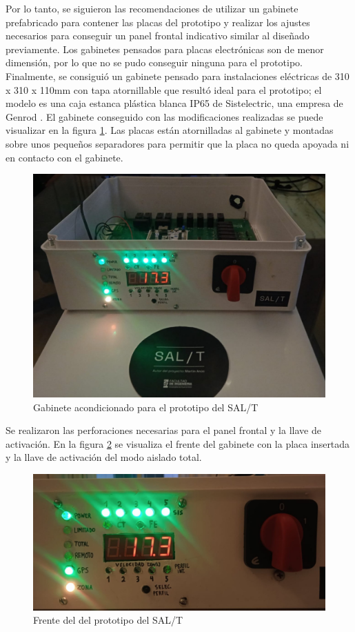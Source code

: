 Por lo tanto, se siguieron las recomendaciones de utilizar un gabinete prefabricado para contener las placas del prototipo y realizar los ajustes necesarios para conseguir un panel frontal indicativo similar al diseñado previamente. Los gabinetes pensados para placas electrónicas son de menor dimensión, por lo que no se pudo conseguir ninguna para el prototipo. Finalmente, se consiguió un gabinete pensado para instalaciones eléctricas de 310 x 310 x 110mm con tapa atornillable que resultó ideal para el prototipo; el modelo es una caja estanca plástica blanca IP65 de Sistelectric, una empresa de Genrod \cite{gabinete}. El gabinete conseguido con las modificaciones realizadas se puede visualizar en la figura \ref{fig:gabinete_fabricado}. Las placas están atornilladas al gabinete y montadas sobre unos pequeños separadores para permitir que la placa no queda apoyada ni en contacto con el gabinete. 

\begin{figure}[H]
    \centering
    \includegraphics[width = \linewidth]{img/salt_fabricado.jpeg}
    \caption{Gabinete acondicionado para el prototipo del SAL/T}
    \label{fig:gabinete_fabricado}
\end{figure} 

Se realizaron las perforaciones necesarias para el panel frontal y la llave de activación. En la figura \ref{fig:frente_fabricado} se visualiza el frente del gabinete con la placa insertada y la llave de activación del modo aislado total. 

\begin{figure}[H]
    \centering
    \includegraphics[width = \linewidth]{img/frente_fabricado.jpeg}
    \caption{Frente del del prototipo del SAL/T}
    \label{fig:frente_fabricado}
\end{figure} 